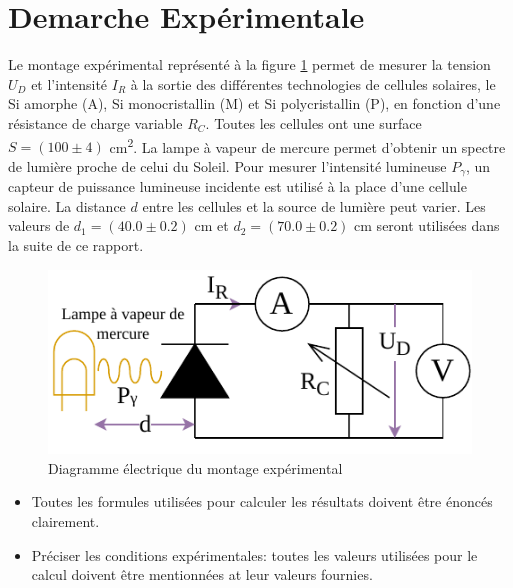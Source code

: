 \section{Demarche Expérimentale}

Le montage expérimental représenté à la figure \ref{fig:montage} permet de mesurer la tension \(U_D\) et l'intensité \(I_R\) à la sortie des différentes technologies de cellules solaires, le Si amorphe (A), Si monocristallin (M) et Si polycristallin (P), en fonction d'une résistance de charge variable \(R_C\).
Toutes les cellules ont une surface \(S = (100 \pm 4)\) \unit{\centi\meter^2}. La lampe à vapeur de mercure permet d'obtenir un spectre de lumière proche de celui du Soleil.
Pour mesurer l'intensité lumineuse \(P_\gamma\), un capteur de puissance lumineuse incidente est utilisé à la place d'une cellule solaire.
La distance \(d\) entre les cellules et la source de lumière peut varier. Les valeurs de \(d_1 = (40.0 \pm 0.2)\) \unit{\centi\meter} et \(d_2 = (70.0 \pm 0.2)\) \unit{\centi\meter} seront utilisées dans la suite de ce rapport.


\begin{figure}
    \centering
    \includegraphics[width=12cm]{figures/montage.pdf}
    \caption{Diagramme électrique du montage expérimental \cite{notice} \cite{nicole}}
    \label{fig:montage}
\end{figure}

\begin{itemize}
\item Toutes les formules utilisées pour calculer les résultats doivent être énoncés clairement.
\item Préciser les conditions expérimentales: toutes les valeurs utilisées pour le calcul doivent être mentionnées at leur valeurs fournies.
\end{itemize}
